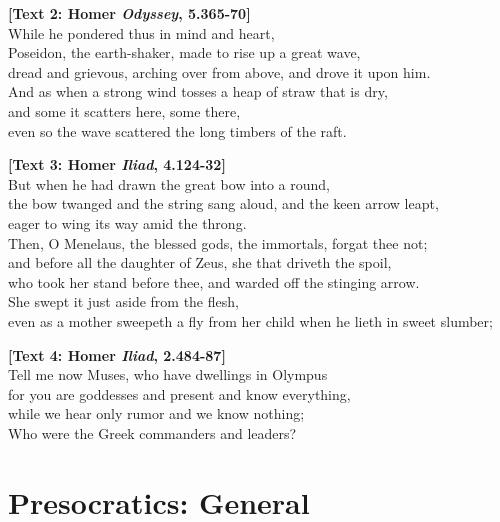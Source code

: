 \documentclass[11pt]{article}
\begin{document}
\vspace*{1mm}

\noindent\textbf{[Text 2: Homer \emph{Odyssey}, 5.365-70]}\\While he pondered thus in mind and heart,\\Poseidon, the earth-shaker, made to rise up a great wave,\\dread and grievous, arching over from above, and drove it upon him.\\And as when a strong wind tosses a heap of straw that is dry, \\and some it scatters here, some there,\\even so the wave scattered the long timbers of the raft.\\

\vspace*{1mm}

\noindent\textbf{[Text 3: Homer \emph{Iliad}, 4.124-32]}\\But when he had drawn the great bow into a round,\\the bow twanged and the string sang aloud, and the keen arrow leapt,\\eager to wing its way amid the throng.\\Then, O Menelaus, the blessed gods, the immortals, forgat thee not;\\and before all the daughter of Zeus, she that driveth the spoil,\\who took her stand before thee, and warded off the stinging arrow.\\She swept it just aside from the flesh,\\even as a mother sweepeth a fly from her child when he lieth in sweet slumber;\\

\vspace*{1mm}

\noindent \textbf{[Text 4: Homer \emph{Iliad}, 2.484-87]}\\Tell me now Muses, who have dwellings in Olympus\\for you are goddesses and present and know everything,\\while we hear only rumor and we know nothing;\\Who were the Greek commanders and leaders?

\section*{Presocratics: General}
\end{document}
